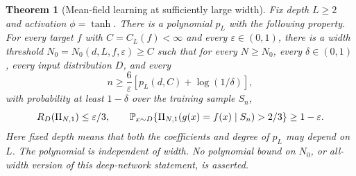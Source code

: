 \documentclass[11pt]{article}
\newtheorem{theorem}{Theorem}[section]
\theoremstyle{remark}\newtheorem{remark}[theorem]{Remark}
\begin{document}
\begin{theorem}[Mean-field learning at sufficiently large width]\label{thm:critical-learning}
Fix depth $L\geq2$ and activation $\phi=\tanh$. There is a polynomial $p_L$
with the following property. For every target $f$ with $C=C_L(f)<\infty$
and every $\varepsilon\in(0,1)$, there is a width threshold
$N_0=N_0(d,L,f,\varepsilon)\geq C$ such that for every $N\geq N_0$,
every $\delta\in(0,1)$, every input distribution $D$, and every
\[
 n\geq\frac6\varepsilon\left[p_L(d,C)+\log(1/\delta)\right],
\]
with probability at least $1-\delta$ over the training sample $S_n$,
\[
 R_D(\Pi_{N,1})\leq\varepsilon/3,
 \qquad
 \mathbb P_{x\sim D}\!\left\{
 \Pi_{N,1}(g(x)=f(x)\mid S_n)>2/3\right\}\geq1-\varepsilon.
\]
Here fixed depth means that both the coefficients and degree of $p_L$
may depend on $L$. The polynomial is independent of width. No polynomial
bound on $N_0$, or
all-width version of this deep-network statement, is asserted.
\end{theorem}
\end{document}
